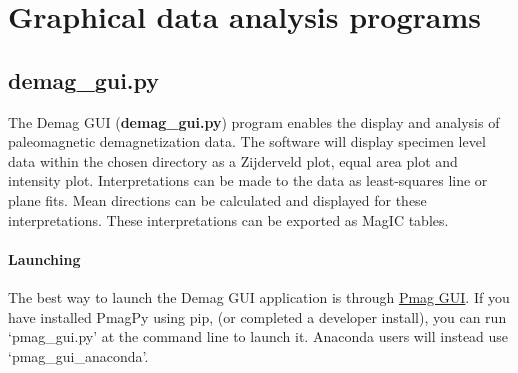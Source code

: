 \documentclass[11pt]{book}
\begin{document}
{{%
%
%
%

\chapter{Graphical data analysis programs}
\section{demag\_gui.py}

The  Demag GUI ({\bf demag\_gui.py}) program enables the display and analysis of paleomagnetic demagnetization data. The software will display specimen level data within the chosen directory as a Zijderveld plot, equal area plot and intensity plot. Interpretations can be made to the data as least-squares line or plane fits. Mean directions can be calculated and displayed for these interpretations. These interpretations can be exported as MagIC tables.

\subsubsection{Launching}\label{launching}

The best way to launch the Demag GUI application is through  \href{#pmag_gui.py}{Pmag GUI}. If you have installed PmagPy using pip, (or completed a developer install), you can run `pmag\_gui.py' at the command line to launch it.  Anaconda users will instead use `pmag\_gui\_anaconda'.

}}
\end{document}
